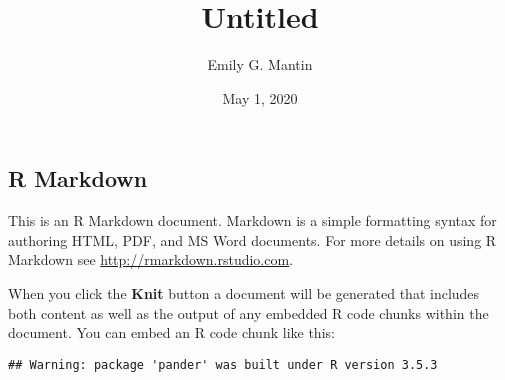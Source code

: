 \documentclass[]{article}
\title{Untitled}
\author{Emily G. Mantin}
\date{May 1, 2020}
\begin{document}
\maketitle

\subsection{R Markdown}\label{r-markdown}

This is an R Markdown document. Markdown is a simple formatting syntax
for authoring HTML, PDF, and MS Word documents. For more details on
using R Markdown see \url{http://rmarkdown.rstudio.com}.

When you click the \textbf{Knit} button a document will be generated
that includes both content as well as the output of any embedded R code
chunks within the document. You can embed an R code chunk like this:

\begin{verbatim}
## Warning: package 'pander' was built under R version 3.5.3
\end{verbatim}
\end{document}

